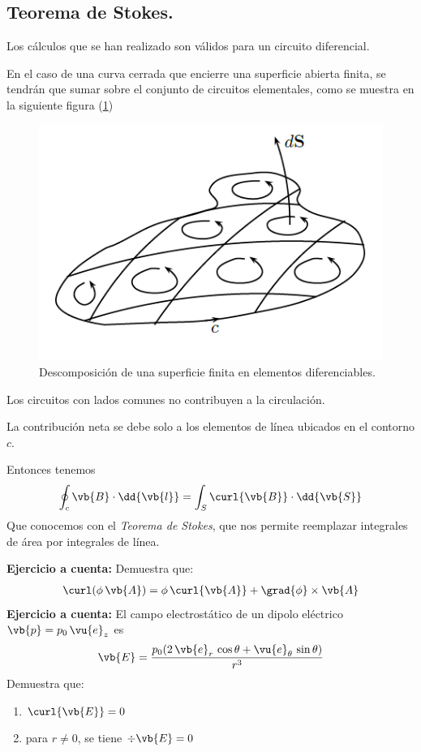 \subsection{Teorema de Stokes.}
Los cálculos que se han realizado son válidos para un circuito diferencial.
\par
En el caso de una curva cerrada que encierre una superficie abierta finita, se tendrán que sumar sobre el conjunto de circuitos elementales, como se muestra en la siguiente figura (\ref{fig:figura_superficie_elementos_diferenciables})
\par
\begin{figure}[H]
    \centering
    \includegraphics[scale=0.6]{Imagenes/Superficie_Elementos_Diferenciables.png}
    \caption{Descomposición de una superficie finita en elementos diferenciables.}
    \label{fig:figura_superficie_elementos_diferenciables}
\end{figure}
Los circuitos con lados comunes no contribuyen a la circulación.
\par
La contribución neta se debe solo a los elementos de línea ubicados en el contorno $c$.
\par
Entonces tenemos
\begin{align}
\oint_{c} \vb{B} \cdot \dd{\vb{l}} = \int_{S} \curl{\vb{B}} \cdot \dd{\vb{S}}
\label{eq:ecuacion_01_35}
\end{align}
Que conocemos con el \emph{Teorema de Stokes}, que nos permite reemplazar integrales de área por integrales de línea.
\par
\textbf{Ejercicio a cuenta: } Demuestra que:
\begin{align*}
\curl(\phi \, \vb{A}) = \phi \, \curl{\vb{A}} + \grad{\phi} \times \vb{A}
\end{align*}
\textbf{ Ejercicio a cuenta: } El campo electrostático de un dipolo eléctrico $\vb{p} = p_{0} \, \vu{e}_{z}$ es
\begin{align*}
\vb{E} = \dfrac{p_{0} (2 \, \vb{e}_{r} \, \cos \theta + \vu{e}_{\theta} \, \sin \theta)}{r^{3}}
\end{align*}
Demuestra que:
\begin{enumerate}
\item $\curl{\vb{E}} = 0$
\item para $r \neq 0$, se tiene $\div{\vb{E}} = 0$
\end{enumerate}
